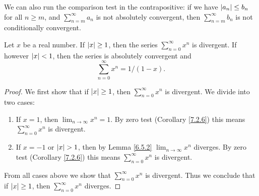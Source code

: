 \begin{note}
We can also run the comparison test in the contrapositive:
if we have \(\abs*{a_n} \leq b_n\) for all \(n \geq m\), and \(\sum_{n = m}^\infty a_n\) is not absolutely convergent, then \(\sum_{n = m}^\infty b_n\) is not conditionally convergent.
\end{note}

\begin{lemma}\label{7.3.3}
Let \(x\) be a real number.
If \(\abs*{x} \geq 1\), then the series \(\sum_{n = 0}^\infty x^n\) is divergent.
If however \(\abs*{x} < 1\), then the series is absolutely convergent and
\[
    \sum_{n = 0}^\infty x^n = 1 / (1 - x).
\]
\end{lemma}

\begin{proof}
We first show that if \(\abs*{x} \geq 1\), then \(\sum_{n = 0}^\infty x^n\) is divergent.
We divide into two cases:
\begin{enumerate}
    \item If \(x = 1\), then \(\lim_{n \to \infty} x^n = 1\). By zero test (Corollary \ref{7.2.6}) this means \(\sum_{n = 0}^\infty x^n\) is divergent.
    \item If \(x = -1\) or \(\abs*{x} > 1\), then by Lemma \ref{6.5.2} \(\lim_{n \to \infty} x^n\) diverges.
    By zero test (Corollary \ref{7.2.6}) this means \(\sum_{n = 0}^\infty x^n\) is divergent.
\end{enumerate}
From all cases above we show that \(\sum_{n = 0}^\infty x^n\) is divergent.
Thus we conclude that if \(\abs*{x} \geq 1\), then \(\sum_{n = 0}^\infty x^n\) diverges.


\end{proof}
